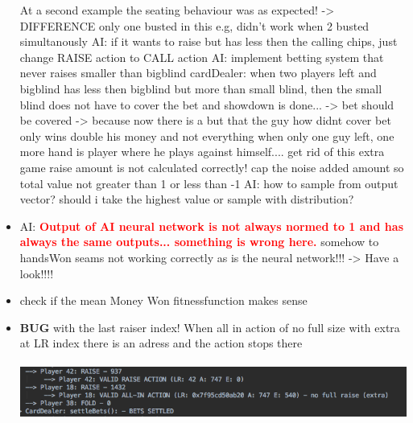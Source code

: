 \begin{itemize}
At a second example the seating behaviour was as expected! -> DIFFERENCE only one busted in this e.g, didn't work when 2 busted simultanously
\subitem AI: if it wants to raise but has less then the calling chips, just change RAISE action to CALL action
\subitem AI: implement betting system that never raises smaller than bigblind
\subitem cardDealer: when two players left and bigblind has less then bigblind but more than small blind, then the small blind does not have to cover the bet and showdown is done... -> bet should be covered -> because now there is a but that the guy how didnt cover bet only wins double his money and not everything
\subitem when only one guy left, one more hand is player where he plays against himself.... get rid of this extra game
\subitem raise amount is not calculated correctly!
\subitem cap the noise added amount so total value not greater than 1 or less than -1
\subitem AI: how to sample from output vector? should i take the highest value or sample with distribution?
\item AI: \textbf{\textcolor{red}{Output of AI neural network is not always normed to 1 and has always the same outputs... something is wrong here.}}
\subitem somehow to handsWon seams not working correctly as is the neural network!!! -> Have a look!!!!
\item check if the mean Money Won fitnessfunction makes sense
\item \textbf{BUG} with the last raiser index! When all in action of no full size with extra at LR index there is an adress and the action stops there\\\\
\includegraphics[width=14cm]{1.png}
\end{itemize}
\pagebreak
